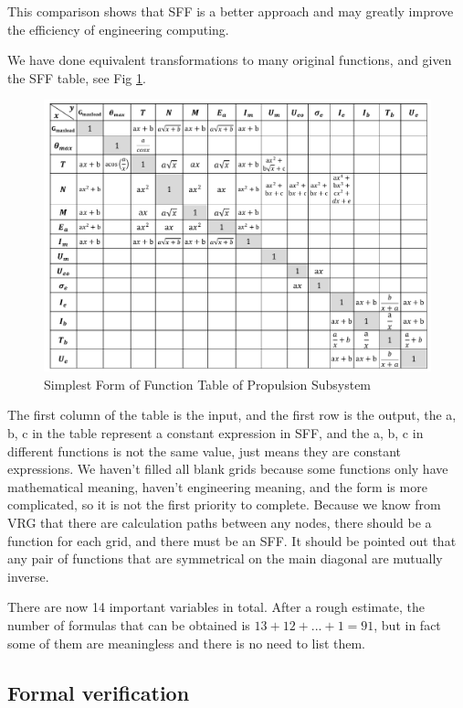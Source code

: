\documentclass{article} %
\numberwithin{equation}{section} %
\begin{document}
This comparison shows that SFF is a better approach and may greatly improve the efficiency of engineering computing.

We have done equivalent transformations to many original functions, and given the SFF table, see Fig \ref{fig:fig2_SimplestFormFunctions}.
\begin{figure}[H]%
\centerline{\includegraphics[width=1.0\textwidth]{fig2_SimplestFormFunctions.pdf}}
\caption{Simplest Form of Function Table of Propulsion Subsystem}
\label{fig:fig2_SimplestFormFunctions}
\end{figure}
The first column of the table is the input, and the first row is the output, the a, b, c in the table represent a constant expression in SFF, and the a, b, c in different functions is not the same value, just means they are constant expressions.
We haven’t filled all blank grids because some functions only have mathematical meaning, haven't engineering meaning, and the form is more complicated, so it is not the first priority to complete.
Because we know from VRG that there are calculation paths between any nodes, there should be a function for each grid, and there must be an SFF.
It should be pointed out that any pair of functions that are symmetrical on the main diagonal are mutually inverse.

There are now 14 important variables in total. 
After a rough estimate, the number of formulas that can be obtained is $13 + 12 + ... + 1 = 91$, but in fact some of them are meaningless and there is no need to list them.

\subsection{Formal verification}\label{main:basic:formal}
\end{document}
